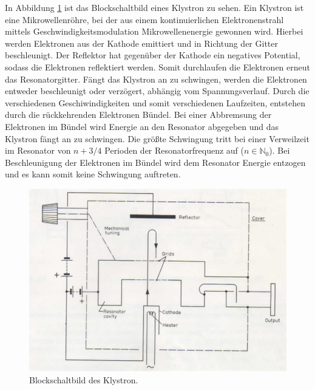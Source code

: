 In Abbildung \ref{abb:2} ist das Blockschaltbild eines Klystron zu sehen.
Ein Klystron ist eine Mikrowellenröhre, bei der aus einem kontinuierlichen Elektronenstrahl mittels Geschwindigkeitsmodulation Mikrowellenenergie gewonnen wird. Hierbei werden Elektronen aus der Kathode emittiert und in Richtung der Gitter beschleunigt. Der Reflektor hat gegenüber der Kathode ein negatives Potential, sodass die Elektronen reflektiert werden. Somit durchlaufen die Elektronen erneut das Resonatorgitter. Fängt das Klystron an zu schwingen, werden die Elektronen entweder beschleunigt oder verzögert, abhängig vom Spannungsverlauf. Durch die verschiedenen Geschiwindigkeiten und somit verschiedenen Laufzeiten, entstehen durch die rückkehrenden Elektronen Bündel. Bei einer Abbremsung der Elektronen im Bündel wird Energie an den Resonator abgegeben und das Klystron fängt an zu schwingen. Die größte Schwingung tritt bei einer Verweilzeit im Resonator von $n+3/4$ Perioden der Resonatorfrequenz auf ($n\in \mathbb{N}_0$). Bei Beschleunigung der Elektronen im Bündel wird dem Resonator Energie entzogen und es kann somit keine Schwingung auftreten.

\begin{figure}
  \centering
  \includegraphics[scale=0.4]{Blockschaltbild.png}
  \caption{Blockschaltbild des Klystron.}
  \label{abb:2}
\end{figure}
